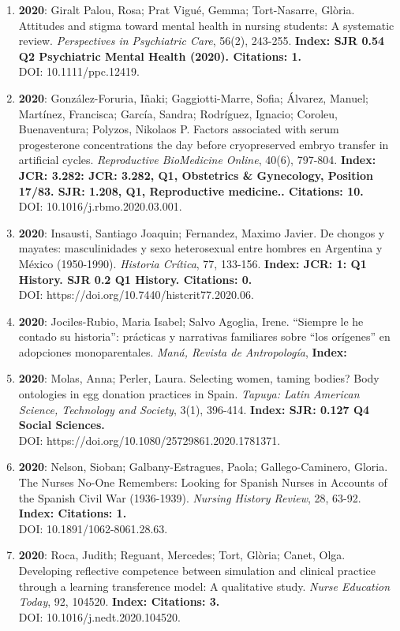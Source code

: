 \begin{enumerate}
\item {\bf 2020}: Giralt Palou, Rosa; Prat Vigué, Gemma; Tort-Nasarre, Glòria.  Attitudes and stigma toward mental health in nursing students: A systematic review. {\it Perspectives in Psychiatric Care}, 56(2), 243-255. {\bf Index: SJR 0.54 Q2 Psychiatric Mental Health (2020). Citations: 1. } \\ DOI: 10.1111/ppc.12419. \filbreak
\item {\bf 2020}: González-Foruria, Iñaki; Gaggiotti-Marre, Sofia; Álvarez, Manuel; Martínez, Francisca; García, Sandra; Rodríguez, Ignacio; Coroleu, Buenaventura; Polyzos, Nikolaos P.  Factors associated with serum progesterone concentrations the day before cryopreserved embryo transfer in artificial cycles. {\it Reproductive BioMedicine Online}, 40(6), 797-804. {\bf Index: JCR: 3.282: JCR: 3.282, Q1, Obstetrics \& Gynecology, Position 17/83.  SJR: 1.208, Q1, Reproductive medicine.. Citations: 10. } \\ DOI: 10.1016/j.rbmo.2020.03.001. \filbreak
\item {\bf 2020}: Insausti, Santiago Joaquin; Fernandez, Maximo Javier.  De chongos y mayates: masculinidades y sexo heterosexual entre hombres en Argentina y México (1950-1990). {\it Historia Crítica}, 77, 133-156. {\bf Index: JCR: 1: Q1 History.  SJR 0.2 Q1 History. Citations: 0. } \\ DOI: https://doi.org/10.7440/histcrit77.2020.06. \filbreak
\item {\bf 2020}: Jociles-Rubio, Maria Isabel; Salvo Agoglia, Irene.  “Siempre le he contado su historia”: prácticas y narrativas familiares sobre “los orígenes” en adopciones monoparentales. {\it Maná, Revista de Antropología}, {\bf Index: } \filbreak
\item {\bf 2020}: Molas, Anna; Perler, Laura.  Selecting women, taming bodies? Body ontologies in egg donation practices in Spain. {\it Tapuya: Latin American Science, Technology and Society}, 3(1), 396-414. {\bf Index: SJR: 0.127 Q4 Social Sciences. } \\ DOI: https://doi.org/10.1080/25729861.2020.1781371. \filbreak
\item {\bf 2020}: Nelson, Sioban; Galbany-Estragues, Paola; Gallego-Caminero, Gloria.  The Nurses No-One Remembers: Looking for Spanish Nurses in Accounts of the Spanish Civil War (1936-1939). {\it Nursing History Review}, 28, 63-92. {\bf Index: Citations: 1. } \\ DOI: 10.1891/1062-8061.28.63. \filbreak
\item {\bf 2020}: Roca, Judith; Reguant, Mercedes; Tort, Glòria; Canet, Olga.  Developing reflective competence between simulation and clinical practice through a learning transference model: A qualitative study. {\it Nurse Education Today}, 92, 104520. {\bf Index: Citations: 3. } \\ DOI: 10.1016/j.nedt.2020.104520. \filbreak

\end{enumerate}

